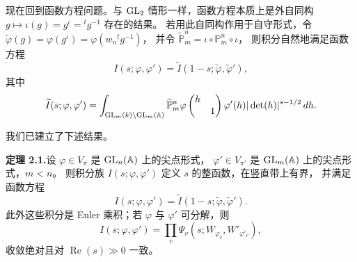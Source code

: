 现在回到函数方程问题。与 $\mathrm{GL}_2$ 情形一样，函数方程本质上是外自同构
$g\mapsto\iota(g)=g^\iota={}^tg^{-1}$ 存在的结果。
若用此自同构作用于自守形式，令
$\widetilde{\varphi}(g)=\varphi(g^\iota)=\varphi(w_n{}^tg^{-1})$，
并令 $\widetilde{\mathbb{P}}^n_m=\iota\circ\mathbb{P}^n_m\circ\iota$，
则积分自然地满足函数方程
\[
I(s;\varphi,\varphi')=\widetilde{I}(1-s;\widetilde{\varphi},\widetilde{\varphi}'),
\]
其中
\[
\widetilde{I}(s;\varphi,\varphi')=\int_{\mathrm{GL}_m(k)\backslash\mathrm{GL}_m(\mathbb{A})}
\widetilde{\mathbb{P}}^n_m\varphi\begin{pmatrix}h&\\&1\end{pmatrix}
\varphi'(h)|\det(h)|^{s-1/2}\,dh.
\]

我们已建立了下述结果。

\textbf{定理 2.1.}\quad 设 $\varphi\in V_\pi$ 是 $\mathrm{GL}_n(\mathbb{A})$ 上的尖点形式，
$\varphi'\in V_{\pi'}$ 是 $\mathrm{GL}_m(\mathbb{A})$ 上的尖点形式，$m<n$。
则积分族 $I(s;\varphi,\varphi')$ 定义 $s$ 的整函数，在竖直带上有界，
并满足函数方程
\[
I(s;\varphi,\varphi')=\widetilde{I}(1-s;\widetilde{\varphi},\widetilde{\varphi}').
\]
此外这些积分是 Euler 乘积；若 $\varphi$ 与 $\varphi'$ 可分解，则
\[
I(s;\varphi,\varphi')=\prod_v\Psi_v(s;W_{\varphi_v},W'_{\varphi'_v}),
\]
收敛绝对且对 $\operatorname{Re}(s)\gg0$ 一致。

